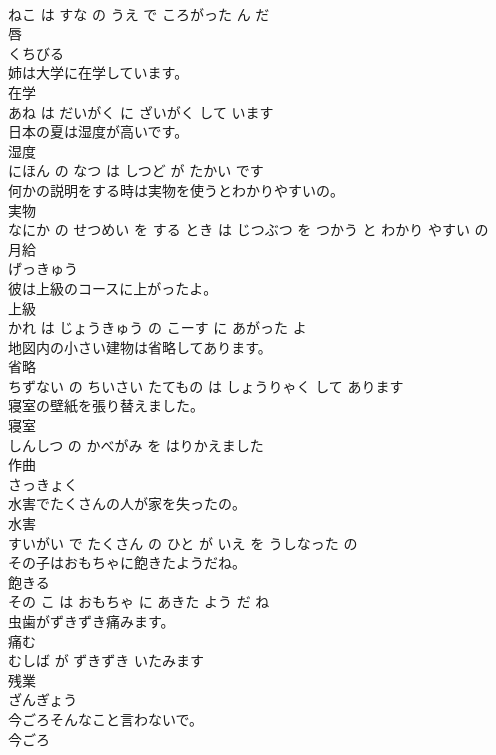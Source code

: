 \documentclass[8pt]{extreport}
\begin{document}
\begin{CJK}{UTF8}{min}
\\	ねこ は すな の うえ で ころがった ん だ			
\\	唇	
\\	くちびる			
\\	姉は大学に在学しています。	
\\	在学 
\\	あね は だいがく に ざいがく して います			
\\	日本の夏は湿度が高いです。	
\\	湿度 
\\	にほん の なつ は しつど が たかい です			
\\	何かの説明をする時は実物を使うとわかりやすいの。	
\\	実物 
\\	なにか の せつめい を する とき は じつぶつ を つかう と わかり やすい の			
\\	月給	
\\	げっきゅう			
\\	彼は上級のコースに上がったよ。	
\\	上級 
\\	かれ は じょうきゅう の こーす に あがった よ			
\\	地図内の小さい建物は省略してあります。	
\\	省略 
\\	ちずない の ちいさい たてもの は しょうりゃく して あります			
\\	寝室の壁紙を張り替えました。	
\\	寝室 
\\	しんしつ の かべがみ を はりかえました			
\\	作曲	
\\	さっきょく			
\\	水害でたくさんの人が家を失ったの。	
\\	水害 
\\	すいがい で たくさん の ひと が いえ を うしなった の			
\\	その子はおもちゃに飽きたようだね。	
\\	飽きる 
\\	その こ は おもちゃ に あきた よう だ ね			
\\	虫歯がずきずき痛みます。	
\\	痛む 
\\	むしば が ずきずき いたみます			
\\	残業	
\\	ざんぎょう			
\\	今ごろそんなこと言わないで。	
\\	今ごろ 

\end{CJK}
\end{document}
